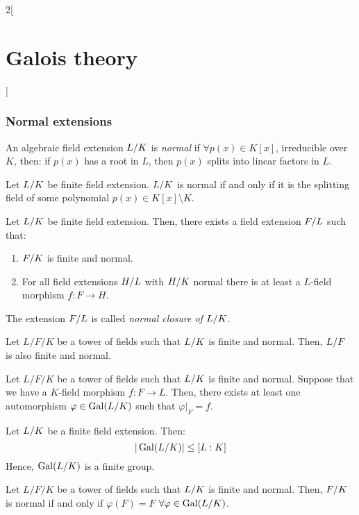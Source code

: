 \documentclass[../../../main.tex]{subfiles}
\begin{document}
\begin{multicols}{2}[\section{Galois theory}]
  \subsubsection{Normal extensions}
  \begin{definition}
    An algebraic field extension $\quot{L}{K}$ is \textit{normal} if $\forall p(x)\in K[x]$, irreducible over $K$, then: if $p(x)$ has a root in $L$, then $p(x)$ splits into linear factors in $L$.
  \end{definition}
  \begin{theorem}
    Let $\quot{L}{K}$ be finite field extension. $\quot{L}{K}$ is normal if and only if it is the splitting field of some polynomial $p(x)\in K[x]\setminus K$.
  \end{theorem}
  \begin{corollary}
    Let $\quot{L}{K}$ be finite field extension. Then, there exists a field extension $\quot{F}{L}$ such that:
    \begin{enumerate}
      \item $\quot{F}{K}$ is finite and normal.
      \item For all field extensions $\quot{H}{L}$ with $\quot{H}{K}$ normal there is at least a $L$-field morphism $f:F\rightarrow H$.
    \end{enumerate}
    The extension $\quot{F}{L}$ is called \textit{normal closure of $\quot{L}{K}$}.
  \end{corollary}
  \begin{corollary}
    Let $L/F/K$ be a tower of fields such that $\quot{L}{K}$ is finite and normal. Then, $\quot{L}{F}$ is also finite and normal.
  \end{corollary}
  \begin{corollary}
    Let $L/F/K$ be a tower of fields such that $\quot{L}{K}$ is finite and normal. Suppose that we have a $K$-field morphism $f:F\rightarrow L$. Then, there exists at least one automorphism $\varphi\in\Gal(\quot{L}{K})$ such that $\varphi|_F=f$.
  \end{corollary}
  \begin{corollary}
    Let $\quot{L}{K}$ be a finite field extension. Then: $$\textstyle|\Gal(\quot{L}{K})|\leq[L:K]$$ Hence, $\Gal(\quot{L}{K})$ is a finite group.
  \end{corollary}
  \begin{corollary}
    Let $L/F/K$ be a tower of fields such that $\quot{L}{K}$ is finite and normal. Then, $\quot{F}{K}$ is normal if and only if $\varphi(F)=F$ $\forall\varphi\in\Gal(\quot{L}{K})$.
  \end{corollary}

\end{multicols}
\end{document}
